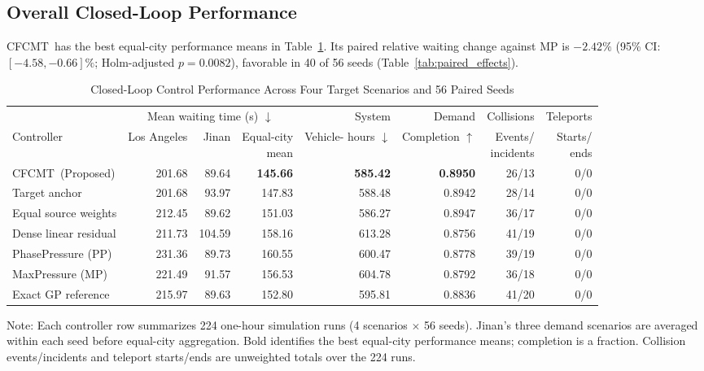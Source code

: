 \documentclass[letterpaper,journal]{IEEEtran}
\newcommand{\method}{CFCMT}
\begin{document}
\subsection{Overall Closed-Loop Performance}
\method\ has the best equal-city performance means in Table~\ref{tab:main_results}. Its paired relative waiting change against MP is $-2.42\%$ (95\% CI: $[-4.58,-0.66]\%$; Holm-adjusted $p=0.0082$), favorable in 40 of 56 seeds (Table~\ref{tab:paired_effects}).

\begin{table}[!t]
\centering
\caption{Closed-Loop Control Performance Across Four Target Scenarios and 56 Paired Seeds}
\label{tab:main_results}
\setlength{\tabcolsep}{4pt}
\begin{tabular}{lrrrrrrr}
\toprule
& \multicolumn{3}{c}{Mean waiting time (s) $\downarrow$} & System & Demand & Collisions & Teleports\\
\cmidrule(lr){2-4}
Controller & Los Angeles & Jinan & \shortstack{Equal-city\\mean} & \shortstack{Vehicle-\\hours $\downarrow$} & \shortstack{Completion\\$\uparrow$} & \shortstack{Events/\\incidents} & \shortstack{Starts/\\ends}\\
\midrule
\method\ (Proposed) & 201.68 & 89.64 & \textbf{145.66} & \textbf{585.42} & \textbf{0.8950} & 26/13 & 0/0\\
Target anchor & 201.68 & 93.97 & 147.83 & 588.48 & 0.8942 & 28/14 & 0/0\\
Equal source weights & 212.45 & 89.62 & 151.03 & 586.27 & 0.8947 & 36/17 & 0/0\\
Dense linear residual & 211.73 & 104.59 & 158.16 & 613.28 & 0.8756 & 41/19 & 0/0\\
PhasePressure (PP) & 231.36 & 89.73 & 160.55 & 600.47 & 0.8778 & 39/19 & 0/0\\
MaxPressure (MP) & 221.49 & 91.57 & 156.53 & 604.78 & 0.8792 & 36/18 & 0/0\\
Exact GP reference & 215.97 & 89.63 & 152.80 & 595.81 & 0.8836 & 41/20 & 0/0\\
\bottomrule
\end{tabular}
\vspace{3pt}
\begin{minipage}{\textwidth}\footnotesize
Note: Each controller row summarizes 224 one-hour simulation runs (4 scenarios $\times$ 56 seeds). Jinan's three demand scenarios are averaged within each seed before equal-city aggregation. Bold identifies the best equal-city performance means; completion is a fraction. Collision events/incidents and teleport starts/ends are unweighted totals over the 224 runs.
\end{minipage}
\end{table}
\end{document}
